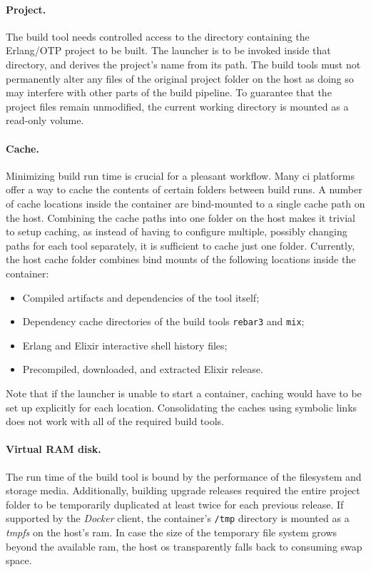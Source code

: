 \paragraph{Project.} The build tool needs controlled access to the directory containing the Erlang/OTP project to be built. The launcher is to be invoked inside that directory, and derives the project's name from its path. The build tools must not permanently alter any files of the original project folder on the host as doing so may interfere with other parts of the build pipeline. To guarantee that the project files remain unmodified, the current working directory is mounted as a read-only volume.

\paragraph{Cache.} Minimizing build run time is crucial for a pleasant workflow. Many \acrshort{ci} platforms offer a way to cache the contents of certain folders between build runs. A number of cache locations inside the container are bind-mounted to a single cache path on the host. Combining the cache paths into one folder on the host makes it trivial to setup caching, as instead of having to configure multiple, possibly changing paths for each tool separately, it is sufficient to cache just one folder. Currently, the host cache folder combines bind mounts of the following locations inside the container:
\begin{itemize}
  \item Compiled artifacts and dependencies of the tool itself;
  \item Dependency cache directories of the build tools \lstinline|rebar3| and \lstinline|mix|;
  \item Erlang and Elixir interactive shell history files;
  \item Precompiled, downloaded, and extracted Elixir release.
\end{itemize}
Note that if the launcher is unable to start a container, caching would have to be set up explicitly for each location. Consolidating the caches using symbolic links does not work with all of the required build tools.

\paragraph{Virtual RAM disk.} The run time of the build tool is bound by the performance of the filesystem and storage media. Additionally, building upgrade releases required the entire project folder to be temporarily duplicated at least twice for each previous release.
If supported by the \emph{Docker} client, the container's \lstinline|/tmp| directory is mounted as a \emph{\acrfull{tmpfs}} on the host's \acrshort{ram}. In case the size of the temporary file system grows beyond the available \acrshort{ram}, the host \acrshort{os} transparently falls back to consuming swap space.


